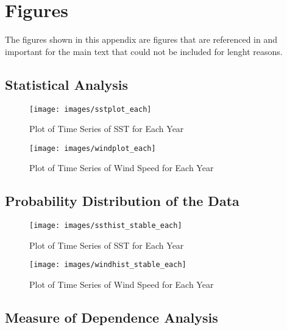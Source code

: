 \section{Figures}\label{app:figures}
The figures shown in this appendix are figures that are referenced in and important for the main text that could not be included for lenght reasons.

\subsection*{Statistical Analysis}

\begin{figure}[H]
	\centering
	\texttt{[image: images/sstplot\_each]}
	\caption{Plot of Time Series of SST for Each Year}
	\label{fig:sstplot-each}
\end{figure}

\newpage

\begin{figure}[H]
	\centering
	\texttt{[image: images/windplot\_each]}
	\caption{Plot of Time Series of Wind Speed for Each Year}
	\label{fig:windplot-each}
\end{figure}

\subsection*{Probability Distribution of the Data}

\begin{figure}[H]
	\centering
	\texttt{[image: images/ssthist\_stable\_each]}
	\caption{Plot of Time Series of SST for Each Year}
	\label{fig:ssthist-each}
\end{figure}

\begin{figure}[H]
	\centering
	\texttt{[image: images/windhist\_stable\_each]}
	\caption{Plot of Time Series of Wind Speed for Each Year}
	\label{fig:windhist-each}
\end{figure}

\subsection*{Measure of Dependence Analysis}

